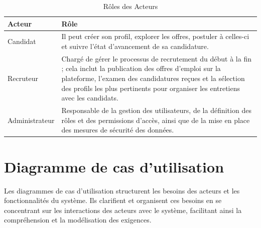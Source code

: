 \renewcommand{\arraystretch}{1.5}
\begin{table}[htbp]
   \centering
   \caption{Rôles des Acteurs}
   \begin{tabular}{|p{3cm}|p{9cm}|}
       \hline
       \rowcolor{blue!30}
       \textbf{Acteur} & \textbf{Rôle} \\
       \hline
       Candidat & Il peut créer son profil, explorer les offres, postuler à celles-ci et suivre l’état d’avancement de sa candidature. \\
       \hline
       Recruteur & Chargé de gérer le processus de recrutement du début à la fin ; cela inclut la publication des offres d’emploi sur la plateforme, l'examen des candidatures reçues et la sélection des profils les plus pertinents pour organiser les entretiens avec les candidats. \\
       \hline
       Administrateur & Responsable de la gestion des utilisateurs, de la définition des rôles et des permissions d’accès, ainsi que de la mise en place des mesures de sécurité des données. \\
       \hline
   \end{tabular}
\end{table}

\section{Diagramme de cas d’utilisation}

Les diagrammes de cas d'utilisation structurent les besoins des acteurs 
et les fonctionnalités du système. Ils clarifient et organisent 
ces besoins en se concentrant sur les interactions des acteurs avec 
le système, facilitant ainsi la compréhension et la modélisation 
des exigences.
\newline
